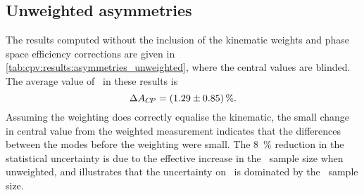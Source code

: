 \subsection{Unweighted asymmetries}

The results computed without the inclusion of the kinematic weights and phase 
space efficiency corrections are given in 
\cref{tab:cpv:results:asymmetries_unweighted}, where the central values are 
blinded.
The average value of \dACP\ in these results is
\begin{equation*}
  \dACP = \deltaACPUnweighted.
\end{equation*}
Assuming the weighting does correctly equalise the kinematic, the small change 
in central value from the weighted measurement indicates that the differences 
between the modes before the weighting were small.
The \SI{8}{\percent} reduction in the statistical uncertainty is due to the 
effective increase in the \ppipi\ sample size when unweighted, and illustrates 
that the uncertainty on \dACP\ is dominated by the \pKK\ sample size.

\begin{table}
  \centering
  \caption{%
    Measured asymmetries for each data sub-sample and combination of 
    sub-samples.
    The computation of the combinations, ``2011 + 2012'' and ``Average'', is 
    defined in \cref{chap:cpv:results:combination}.
    The central values of all measurements are blinded.
  }
  \label{tab:cpv:results:asymmetries}
    
\end{table}

\begin{table}
  \centering
  \caption{%
    Measured asymmetries for each data sub-sample and combination of 
    sub-samples without the inclusion of the kinematic weights and phase space 
    efficiency correction.
    The computation of the combinations, ``2011 + 2012'' and ``Average'', is 
    defined in \cref{chap:cpv:results:combination}.
    The central values of all measurements are blinded.
  }
  \label{tab:cpv:results:asymmetries_unweighted}
    
\end{table}

